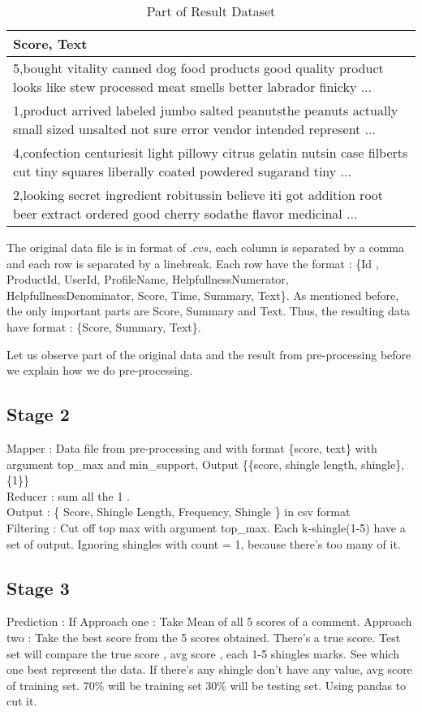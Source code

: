 \begin{table*}
  \caption{Part of Result Dataset}
  \label{tab:commands}
  \begin{tabular}{l}
    \toprule
    Score, Text\\
    \midrule
	5,bought vitality canned dog food products good quality product looks like stew processed meat smells better labrador finicky ... \\ 
	1,product arrived labeled jumbo salted peanutsthe peanuts actually small sized unsalted not sure error vendor intended represent ... \\ 
	4,confection centuriesit light pillowy citrus gelatin nutsin case filberts cut tiny squares liberally coated powdered sugarand tiny ...\\ 
	2,looking secret ingredient robitussin believe iti got addition root beer extract ordered good cherry sodathe flavor medicinal ... \\ 
	\bottomrule
  \end{tabular}
\end{table*}


The original data file is in format of \(.cvs\), each column is separated by a comma and each row is separated by a linebreak. Each row have the format : \{Id , ProductId, UserId, ProfileName, HelpfullnessNumerator, HelpfullnessDenominator, Score, Time, Summary, Text\}. As mentioned before, the only important parts are Score, Summary and Text. Thus, the resulting data have format : \{Score, Summary, Text\}.

Let us observe part of the original data and the result from pre-processing before we explain how we do pre-processing.




\subsection{Stage 2}
Mapper : Data file from pre-processing and with format \{score, text\} with argument top\_max and min\_support, Output \{\{score, shingle length, shingle\},\{1\}\} \\
Reducer : sum all the 1 .\\
Output :  \{ Score, Shingle Length, Frequency, Shingle \}  in csv format \\
Filtering : Cut off top max with argument top\_max.
Each k-shingle(1-5) have a set of output. 
Ignoring shingles with count = 1, because there's too many of it.\\
\subsection{Stage 3}
Prediction : If 
Approach one : Take Mean of all 5 scores of a comment.
Approach two : Take the best score from the 5 scores obtained.
There's a true score.
Test set will compare the true score , avg score , each 1-5 shingles marks. See which one best represent the data.
If there's any shingle don't have any value, avg score of training set.
70\% will be training set 30\% will be testing set. Using pandas to cut it.

